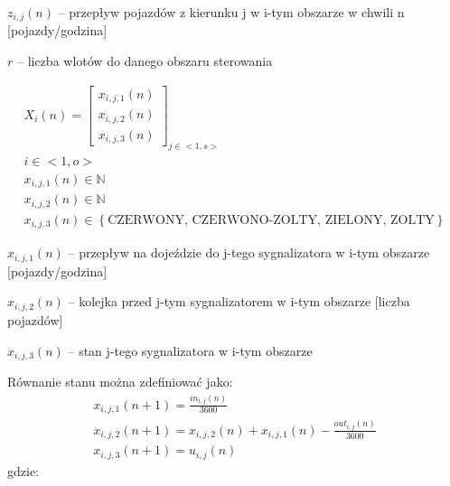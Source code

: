 \begin{math} z_{i,j} (n) \end{math} \textrm{ -- przepływ pojazdów z kierunku j w i-tym obszarze w chwili n [pojazdy/godzina]}

\begin{math} r \end{math} -- liczba wlotów do danego obszaru sterowania

\begin{equation}
	\begin{array}{c}
		X_i (n) = \left[
			\begin{array}{c}
				x_{i, j, 1} (n) \\ x_{i, j, 2} (n) \\ x_{i, j, 3} (n)
			\end{array}
		\right]_{j \in <1,s>}\\
		i \in <1,o>\\
		x_{i, j, 1} (n) \in \mathbb{N}\\
		x_{i, j, 2} (n) \in \mathbb{N}\\
		x_{i, j, 3} (n) \in \left\{ \textrm{CZERWONY, CZERWONO-ZOLTY, ZIELONY, ZOLTY} \right\}
	\end{array}
\end{equation}

\begin{math} x_{i, j, 1} (n) \end{math} \textrm{ -- przepływ na dojeździe do j-tego sygnalizatora w i-tym obszarze [pojazdy/godzina]}

\begin{math} x_{i, j, 2} (n) \end{math} \textrm{ -- kolejka przed j-tym sygnalizatorem w i-tym obszarze [liczba pojazdów]}

\begin{math} x_{i, j, 3} (n) \end{math} \textrm{ -- stan j-tego sygnalizatora w i-tym obszarze}

Równanie stanu można zdefiniować jako:
\begin{equation}
	\begin{array}{c}
		x_{i, j, 1} (n+1) = \frac{in_{i, j} (n)}{3600} \\
		x_{i, j, 2} (n+1) = x_{i, j, 2} (n) + x_{i, j, 1} (n) - \frac{out_{i, j} (n)}{3600}\\
		x_{i, j, 3} (n+1) = u_{i, j} (n)
	\end{array}
\end{equation}
gdzie:

